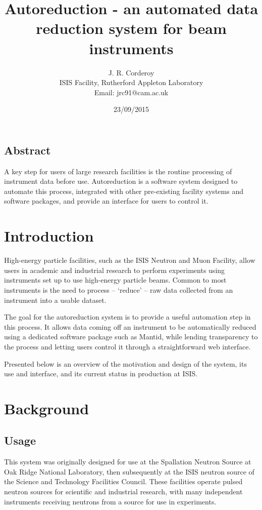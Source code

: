 \documentclass[twocolumn]{article}
\title{\textbf{Autoreduction - an automated data reduction system for beam instruments}}
\author{J. R. Corderoy\\
ISIS Facility, Rutherford Appleton Laboratory\\
Email: jrc91@cam.ac.uk}
\date{23/09/2015}
\begin{document}
\maketitle

\subsection*{Abstract}\label{abstract}

A key step for users of large research facilities is the routine
processing of instrument data before use. Autoreduction is a software
system designed to automate this process, integrated with other
pre-existing facility systems and software packages, and provide
an interface for users to control it.

\section{Introduction}\label{introduction}

High-energy particle facilities, such as the ISIS Neutron and Muon
Facility, allow users in academic and industrial research
to perform experiments using instruments set up to use high-energy
particle beams. Common to most instruments is the need to process -- 
`reduce' -- raw data collected from an instrument into a usable dataset.

The goal for the autoreduction system is to provide a useful automation
step in this process. It allows data coming off an instrument to be
automatically reduced using a dedicated software package such as 
Mantid\cite{mantid}, while lending transparency to the process and
letting users control it through a straightforward web interface.

Presented below is an overview of the motivation and design of the system,
its use and interface, and its current status in production at ISIS.

\section{Background}\label{background}

\subsection{Usage}\label{usage}

This system was originally designed for use at the Spallation Neutron
Source at Oak Ridge National Laboratory, then subsequently at the ISIS
neutron source of the Science and Technology Facilities Council. These
facilities operate pulsed neutron sources for scientific and industrial
research, with many independent instruments receiving neutrons from a
source for use in experiments.
\end{document}
